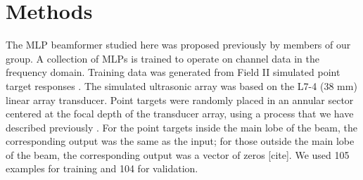 \chapter{Methods}


The MLP beamformer studied here was proposed previously by members of our group\cite{luchies_tmi_2018}. A collection of MLPs is trained to operate on channel data in the frequency domain. Training data was generated from Field II simulated point target responses \cite{field_ii}. The simulated ultrasonic array was based on the L7-4 (38 mm) linear array transducer. Point targets were randomly placed in an annular sector centered at the focal depth of the transducer array, using a process that we have described previously \cite{training_improvements}. For the point targets inside the main lobe of the beam, the corresponding output was the same as the input; for those outside the main lobe of the beam, the corresponding output was a vector of zeros [cite]. We used 105 examples for training and 104 for validation.

